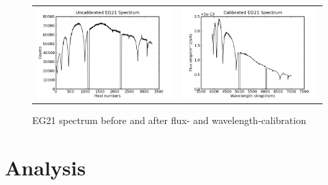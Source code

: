 \begin{figure}
\begin{narrow}{-1in}{0in}
\begin{tabular}{cc}
 \includegraphics[width=0.65\columnwidth, bb=0 0 600 400]{images/uncalEG21.png} &
 \includegraphics[width=0.65\columnwidth, bb=0 0 600 400]{images/calEG21.png} \\
\end{tabular}
\end{narrow}
\caption[EG21 spectrum before and after flux-calibration]{EG21 spectrum before and after flux- and wavelength-calibration} 
\label{cal_uncal}

\end{figure}




\pagebreak
\section{Analysis}
\label{spec_analysis}


